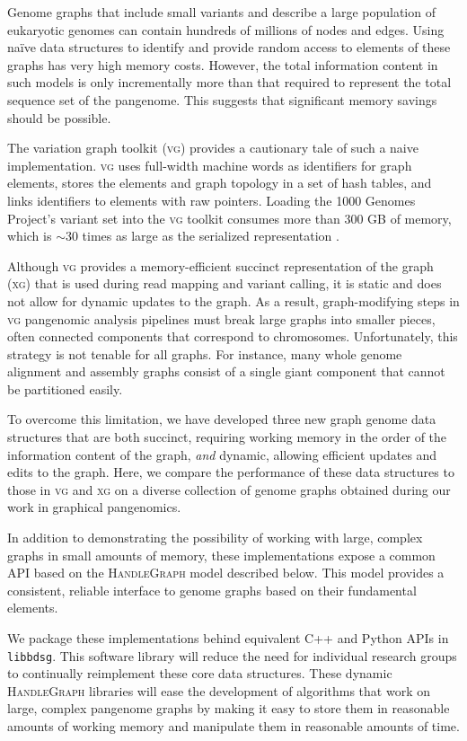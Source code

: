 \documentclass{article}
\begin{document}
Genome graphs that include small variants and describe a large population of eukaryotic genomes can contain hundreds of millions of nodes and edges.
Using na\"ive data structures to identify and provide random access to elements of these graphs has very high memory costs.
However, the total information content in such models is only incrementally more than that required to represent the total sequence set of the pangenome.
This suggests that significant memory savings should be possible.

The variation graph toolkit (\textsc{vg}) \cite{Garrison_2018} provides a cautionary tale of such a naive implementation.
\textsc{vg} uses full-width machine words as identifiers for graph elements, stores the elements and graph topology in a set of hash tables, and links identifiers to elements with raw pointers.
Loading the 1000 Genomes Project's variant set into the \textsc{vg} toolkit consumes more than 300 GB of memory, which is $\sim$30 times as large as the serialized representation \cite{Garrison_2019}.

Although \textsc{vg} provides a memory-efficient succinct representation of the graph (\textsc{xg}) that is used during read mapping and variant calling, it is static and does not allow for dynamic updates to the graph.
As a result, graph-modifying steps in \textsc{vg} pangenomic analysis pipelines must break large graphs into smaller pieces, often connected components that correspond to chromosomes.
Unfortunately, this strategy is not tenable for all graphs.
For instance, many whole genome alignment and assembly graphs consist of a single giant component that cannot be partitioned easily.

To overcome this limitation, we have developed three new graph genome data structures that are both succinct, requiring working memory in the order of the information content of the graph, \emph{and} dynamic, allowing efficient updates and edits to the graph.
Here, we compare the performance of these data structures to those in \textsc{vg} and \textsc{xg} on a diverse collection of genome graphs obtained during our work in graphical pangenomics.

In addition to demonstrating the possibility of working with large, complex graphs in small amounts of memory, these implementations expose a common API based on the \textsc{HandleGraph} model described below.
This model provides a consistent, reliable interface to genome graphs based on their fundamental elements.

We package these implementations behind equivalent C++ and Python APIs in \texttt{libbdsg}.
This software library will reduce the need for individual research groups to continually reimplement these core data structures.
These dynamic \textsc{HandleGraph} libraries will ease the development of algorithms that work on large, complex pangenome graphs by making it easy to store them in reasonable amounts of working memory and manipulate them in reasonable amounts of time.
\end{document}
